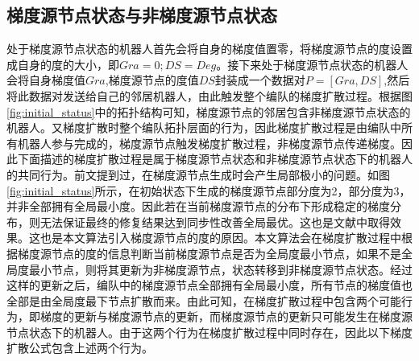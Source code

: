 \subsection{梯度源节点状态与非梯度源节点状态}
处于梯度源节点状态的机器人首先会将自身的梯度值置零，将梯度源节点的度设置成自身的度的大小，即$Gra=0; DS = Deg$。接下来处于梯度源节点状态的机器人会将自身梯度值$Gra$,梯度源节点的度值$DS$封装成一个数据对$P = [Gra,DS]$,然后将此数据对发送给自己的邻居机器人，由此触发整个编队的梯度扩散过程。根据图\ref{fig:initial_status}中的拓扑结构可知，梯度源节点的邻居包含非梯度源节点状态的机器人。又梯度扩散时整个编队拓扑层面的行为，因此梯度扩散过程是由编队中所有机器人参与完成的，梯度源节点触发梯度扩散过程，非梯度源节点传递梯度。因此下面描述的梯度扩散过程是属于梯度源节点状态和非梯度源节点状态下的机器人的共同行为。前文提到过，在梯度源节点生成时会产生局部极小的问题。如图\ref{fig:initial_status}所示，在初始状态下生成的梯度源节点部分度为2，部分度为3，并非全部拥有全局最小度。因此若在当前梯度源节点的分布下形成稳定的梯度分布，则无法保证最终的修复结果达到同步性改善全局最优。这也是文献\parencite{liu2015gradient}中取得效果。这也是本文算法引入梯度源节点的度的原因。本文算法会在梯度扩散过程中根据梯度源节点的度的信息判断当前梯度源节点是否为全局度最小节点，如果不是全局度最小节点，则将其更新为非梯度源节点，状态转移到非梯度源节点状态。经过这样的更新之后，编队中的梯度源节点全部拥有全局最小度，所有节点的梯度值也全部是由全局度最下节点扩散而来。由此可知，在梯度扩散过程中包含两个可能行为，即梯度的更新与梯度源节点的更新，而梯度源节点的更新只可能发生在梯度源节点状态下的机器人。由于这两个行为在梯度扩散过程中同时存在，因此以下梯度扩散公式包含上述两个行为。

